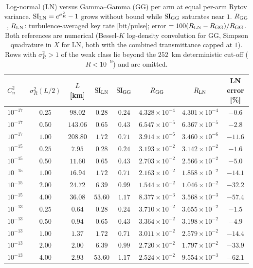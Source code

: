\begin{table}[htbp]
\centering\small
\caption{Log-normal (LN) versus Gamma--Gamma (GG) per arm at equal per-arm Rytov variance. $\mathrm{SI}_{\rm LN}=e^{\sigma_R^2}-1$ grows without bound while $\mathrm{SI}_{\rm GG}$ saturates near $1$. $R_{\rm GG}$, $R_{\rm LN}$: turbulence-averaged key rate [bit/pulse]; error $=100(R_{\rm LN}-R_{\rm GG})/R_{\rm GG}$. Both references are numerical (Bessel-$K$ log-density convolution for GG, Simpson quadrature in $X$ for LN, both with the combined transmittance capped at $1$). Rows with $\sigma_R^2>1$ of the weak class lie beyond the $252$~km deterministic cut-off ($R<10^{-9}$) and are omitted.}
\label{tab:lnvsgg}
\begin{tabular}{lccccccc}
\toprule
$C_n^2$ & $\sigma_R^2(L/2)$ & $L$ [km] & $\mathrm{SI}_{\rm LN}$ & $\mathrm{SI}_{\rm GG}$ & $R_{\rm GG}$ & $R_{\rm LN}$ & LN error [\%]\\
\midrule
$10^{-17}$ & $0.25$ & $98.02$ & $0.28$ & $0.24$ & $4.328\times10^{-4}$ & $4.301\times10^{-4}$ & $-0.6$ \\
$10^{-17}$ & $0.50$ & $143.06$ & $0.65$ & $0.43$ & $6.547\times10^{-5}$ & $6.367\times10^{-5}$ & $-2.8$ \\
$10^{-17}$ & $1.00$ & $208.80$ & $1.72$ & $0.71$ & $3.914\times10^{-6}$ & $3.460\times10^{-6}$ & $-11.6$ \\
\midrule
$10^{-15}$ & $0.25$ & $7.95$ & $0.28$ & $0.24$ & $3.193\times10^{-2}$ & $3.142\times10^{-2}$ & $-1.6$ \\
$10^{-15}$ & $0.50$ & $11.60$ & $0.65$ & $0.43$ & $2.703\times10^{-2}$ & $2.566\times10^{-2}$ & $-5.0$ \\
$10^{-15}$ & $1.00$ & $16.94$ & $1.72$ & $0.71$ & $2.163\times10^{-2}$ & $1.858\times10^{-2}$ & $-14.1$ \\
$10^{-15}$ & $2.00$ & $24.72$ & $6.39$ & $0.99$ & $1.544\times10^{-2}$ & $1.046\times10^{-2}$ & $-32.2$ \\
$10^{-15}$ & $4.00$ & $36.08$ & $53.60$ & $1.17$ & $8.377\times10^{-3}$ & $3.568\times10^{-3}$ & $-57.4$ \\
\midrule
$10^{-13}$ & $0.25$ & $0.64$ & $0.28$ & $0.24$ & $3.710\times10^{-2}$ & $3.655\times10^{-2}$ & $-1.5$ \\
$10^{-13}$ & $0.50$ & $0.94$ & $0.65$ & $0.43$ & $3.364\times10^{-2}$ & $3.198\times10^{-2}$ & $-4.9$ \\
$10^{-13}$ & $1.00$ & $1.37$ & $1.72$ & $0.71$ & $3.011\times10^{-2}$ & $2.579\times10^{-2}$ & $-14.4$ \\
$10^{-13}$ & $2.00$ & $2.00$ & $6.39$ & $0.99$ & $2.720\times10^{-2}$ & $1.797\times10^{-2}$ & $-33.9$ \\
$10^{-13}$ & $4.00$ & $2.93$ & $53.60$ & $1.17$ & $2.524\times10^{-2}$ & $9.554\times10^{-3}$ & $-62.1$ \\

\bottomrule
\end{tabular}
\end{table}


